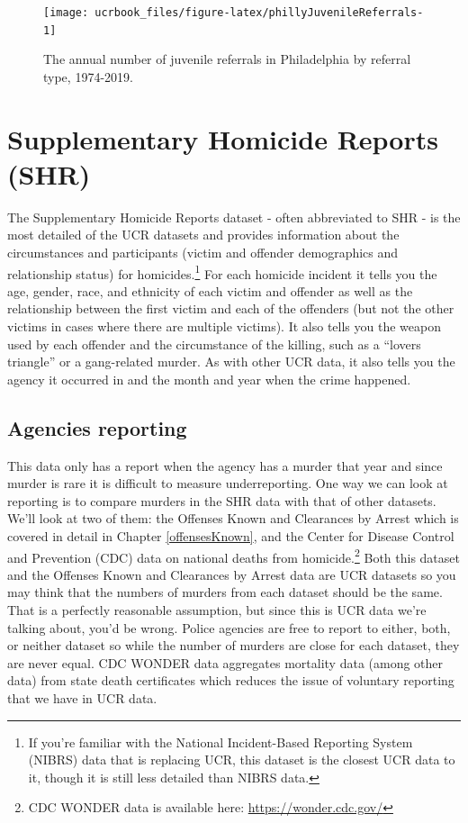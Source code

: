 \documentclass[
  12pt,
  openany]{book}
\begin{document}
\begin{figure}

{\centering \texttt{[image: ucrbook\_files/figure-latex/phillyJuvenileReferrals-1]} 

}

\caption{The annual number of juvenile referrals in Philadelphia by referral type, 1974-2019.}\label{fig:phillyJuvenileReferrals}
\end{figure}

\hypertarget{shr}{%
\chapter{Supplementary Homicide Reports (SHR)}\label{shr}}

The Supplementary Homicide Reports dataset - often abbreviated to SHR - is the most detailed of the UCR datasets and provides information about the circumstances and participants (victim and offender demographics and relationship status) for homicides.\footnote{If you're familiar with the National Incident-Based Reporting System (NIBRS) data that is replacing UCR, this dataset is the closest UCR data to it, though it is still less detailed than NIBRS data.} For each homicide incident it tells you the age, gender, race, and ethnicity of each victim and offender as well as the relationship between the first victim and each of the offenders (but not the other victims in cases where there are multiple victims). It also tells you the weapon used by each offender and the circumstance of the killing, such as a ``lovers triangle'' or a gang-related murder. As with other UCR data, it also tells you the agency it occurred in and the month and year when the crime happened.

\hypertarget{agencies-reporting-3}{%
\section{Agencies reporting}\label{agencies-reporting-3}}

This data only has a report when the agency has a murder that year and since murder is rare it is difficult to measure underreporting. One way we can look at reporting is to compare murders in the SHR data with that of other datasets. We'll look at two of them: the Offenses Known and Clearances by Arrest which is covered in detail in Chapter \ref{offensesKnown}, and the Center for Disease Control and Prevention (CDC) data on national deaths from homicide.\footnote{CDC WONDER data is available here: \url{https://wonder.cdc.gov/}} Both this dataset and the Offenses Known and Clearances by Arrest data are UCR datasets so you may think that the numbers of murders from each dataset should be the same. That is a perfectly reasonable assumption, but since this is UCR data we're talking about, you'd be wrong. Police agencies are free to report to either, both, or neither dataset so while the number of murders are close for each dataset, they are never equal. CDC WONDER data aggregates mortality data (among other data) from state death certificates which reduces the issue of voluntary reporting that we have in UCR data.
\end{document}
